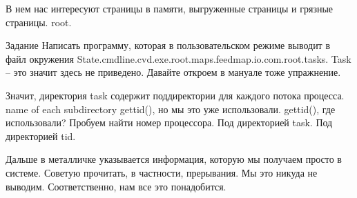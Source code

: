 \documentclass[12pt]{article} %
\begin{document}

В нем нас интересуют страницы в памяти, выгруженные страницы и грязные страницы. root. 

Задание Написать программу, которая в пользовательском режиме выводит в файл окружения State.cmdline.cvd.exe.root.maps.feedmap.io.com.root.tasks.  Task -- это значит здесь не приведено.  Давайте откроем в мануале тоже упражнение.  

Значит, директория task содержит поддиректории для каждого потока процесса.  name of each subdirectory   gettid(), но мы это уже использовали.  gettid(), где использовали? Пробуем найти номер процессора.  Под директорией task.  Под директорией tid.  

Дальше в металличке указывается информация, которую мы получаем просто в системе. Советую прочитать, в частности, прерывания.  Мы это никуда не выводим.  Соответственно, нам все это понадобится.

\end{document}
